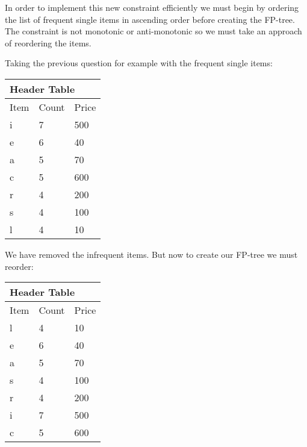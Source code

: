 \documentclass[a4paper]{article}
\begin{document}
In order to implement this new constraint efficiently we must begin by ordering the list of frequent single items in ascending order before creating the FP-tree. The constraint is not monotonic or anti-monotonic so we must take an approach of reordering the items.

Taking the previous question for example with the frequent single items:

\begin{table}[h]
\centering
\begin{tabular}{|l|l|l|}
\hline
\multicolumn{3}{|l|}{Header Table} \\ \hline
Item      & Count      & Price     \\ \hline
i         & 7          & 500       \\ \hline
e         & 6          & 40        \\ \hline
a         & 5          & 70        \\ \hline
c         & 5          & 600       \\ \hline
r         & 4          & 200       \\ \hline
s         & 4          & 100       \\ \hline
l         & 4          & 10        \\ \hline
\end{tabular}
\end{table}

We have removed the infrequent items. But now to create our FP-tree we must reorder:

\begin{table}[h]
\centering
\begin{tabular}{|l|l|l|}
\hline
\multicolumn{3}{|l|}{Header Table} \\ \hline
Item      & Count      & Price     \\ \hline
l         & 4          & 10        \\ \hline
e         & 6          & 40        \\ \hline
a         & 5          & 70        \\ \hline
s         & 4          & 100       \\ \hline
r         & 4          & 200       \\ \hline
i         & 7          & 500       \\ \hline
c         & 5          & 600       \\ \hline
\end{tabular}
\end{table}
\end{document}
